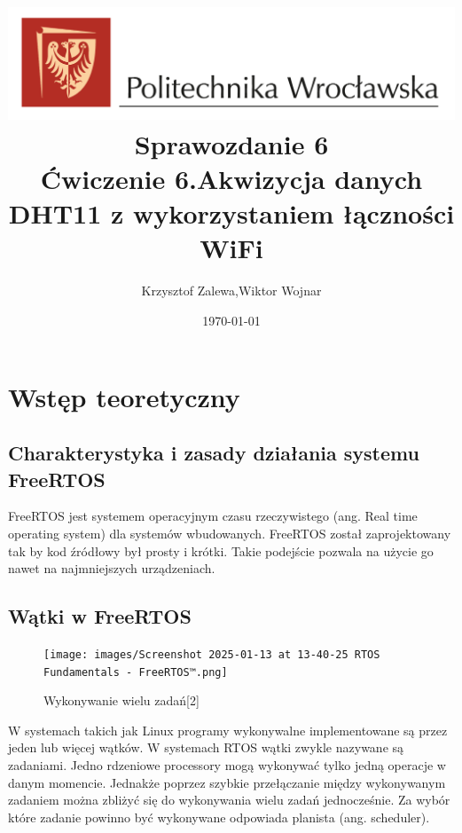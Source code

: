 \documentclass{article}
\title{
  \centering
  \includegraphics[width=\textwidth]{images/logo_PWr_kolor_poziom.png}\\
  \fontsize{28pt}{30pt}\selectfont Sprawozdanie 6\\
  \fontsize{14pt}{30pt}\selectfont Ćwiczenie 6.Akwizycja danych \linebreak DHT11 z wykorzystaniem łączności WiFi}
\author{Krzysztof Zalewa,Wiktor Wojnar}
\date{\daymonthyear\today}
\begin{document}
    \maketitle
    \pagebreak
    \tableofcontents
    \FloatBarrier
    \section{Wstęp teoretyczny}
        \subsection{Charakterystyka i zasady działania systemu FreeRTOS}
            FreeRTOS jest systemem operacyjnym czasu rzeczywistego (ang. Real time operating
            system) dla systemów wbudowanych. FreeRTOS został zaprojektowany tak by kod 
            źródłowy był prosty i krótki. Takie podejście pozwala na użycie go nawet na 
            najmniejszych urządzeniach. 
        \subsection{Wątki w FreeRTOS}
            \begin{figure}[ht]
                \centering
                \texttt{[image: images/Screenshot 2025-01-13 at 13-40-25 RTOS Fundamentals - FreeRTOS™.png]}
                \caption{Wykonywanie wielu zadań[2]}
                \label{fig:multithread}
            \end{figure}
            \FloatBarrier
            W systemach takich jak Linux programy wykonywalne implementowane są przez jeden
            lub więcej wątków. W systemach RTOS wątki zwykle nazywane są zadaniami. Jedno
            rdzeniowe processory mogą wykonywać tylko jedną operacje w danym momencie. 
            Jednakże poprzez szybkie przełączanie między wykonywanym zadaniem można zbliżyć
            się do wykonywania wielu zadań jednocześnie. Za wybór które zadanie powinno być
            wykonywane odpowiada planista (ang. scheduler).
\end{document}
